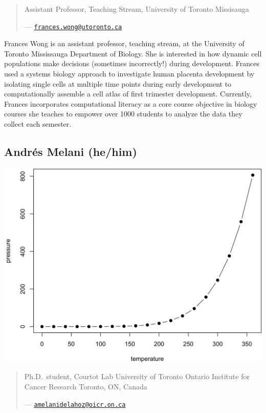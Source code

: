 \documentclass[
]{book}
\theoremstyle{definition}
\theoremstyle{definition}
\theoremstyle{definition}
\theoremstyle{definition}
\theoremstyle{remark}
\begin{document}
\begin{quote}
Assistant Professor, Teaching Stream,
University of Toronto Missisauga

--- \href{mailto:frances.wong@utoronto.ca}{\nolinkurl{frances.wong@utoronto.ca}}
\end{quote}

Frances Wong is an assistant professor, teaching stream, at the University of Toronto
Mississauga Department of Biology. She is interested in how dynamic cell populations make
decisions (sometimes incorrectly!) during development. Frances used a systems biology
approach to investigate human placenta development by isolating single cells at multiple time
points during early development to computationally assemble a cell atlas of first trimester
development. Currently, Frances incorporates computational literacy as a core course
objective in biology courses she teaches to empower over 1000 students to analyze the data
they collect each semester.

\subsection*{\texorpdfstring{Andrés Melani (he/him) }{Andrés Melani  (he/him) }}\label{andruxe9s-melani-hehim}

\begin{center}\includegraphics[width=0.65\linewidth]{./_main_files/figure-html/nice-fig-1} \end{center}

\begin{quote}
Ph.D.~student, Courtot Lab
University of Toronto \textbar{} Ontario Institute for Cancer Research
Toronto, ON, Canada

--- \href{mailto:amelanidelahoz@oicr.on.ca}{\nolinkurl{amelanidelahoz@oicr.on.ca}}
\end{quote}
\end{document}
